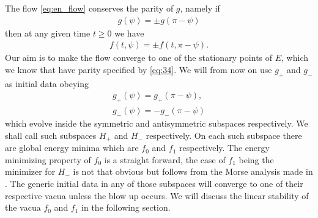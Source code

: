 The flow \eqref{eq:en_flow} conserves the parity of $g$, namely if
\begin{align}
  \label{eq:33}
  g(\psi)=\pm g(\pi-\psi)
\end{align}
then at any given time $t\ge0$ we have
\begin{align}\label{eq:35}
  f(t,\psi)=\pm f(t,\pi-\psi).
\end{align}
Our aim is to make the flow converge to one of the stationary points
of $E$, which we know that have parity specified by \eqref{eq:34}. We
will from now on use $g_+$ and $g_-$ as initial data obeying
\begin{align}
  \label{eq:36}
  g_+(\psi)=g_+(\pi-\psi),\\
  g_-(\psi)=-g_-(\pi-\psi)
\end{align}
which evolve inside the symmetric and antisymmetric subspaces
respectively. We shall call such subspaces $H_+$ and $H_-$
respectively. On each such subspace there are global energy minima
which are $f_0$ and $f_1$ respectively. The energy minimizing property
of $f_0$ is a straight forward, the case of $f_1$ being the minimizer
for $H_-$ is not that obvious but follows from the Morse analysis made
in \cite{Corlette2001}. The generic initial data in any of those
subspaces will converge to one of their respective vacua unless the
blow up occurs. We will discuss the linear stability of the vacua
$f_0$ and $f_1$ in the following section.

